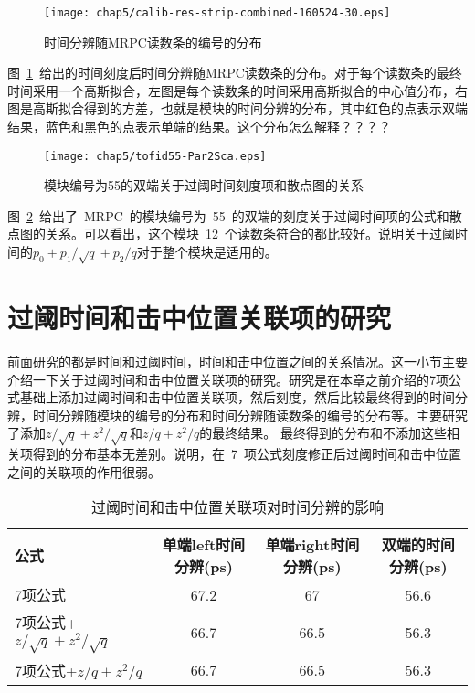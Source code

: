 \begin{figure}[!h]
\centering
\texttt{[image: chap5/calib-res-strip-combined-160524-30.eps]}
\caption{时间分辨随MRPC读数条的编号的分布}
\label{fig:calib-res-strip-combined-160524-30}
\end{figure}
图~\ref{fig:calib-res-strip-combined-160524-30}~给出的时间刻度后时间分辨随MRPC读数条的分布。对于每个读数条的最终时间采用一个高斯拟合，左图是每个读数条的时间采用高斯拟合的中心值分布，右图是高斯拟合得到的方差，也就是模块的时间分辨的分布，其中红色的点表示双端结果，蓝色和黑色的点表示单端的结果。这个分布怎么解释？？？？

\begin{figure}[!h]
\centering
\texttt{[image: chap5/tofid55-Par2Sca.eps]}
\caption{模块编号为55的双端关于过阈时间刻度项和散点图的关系}
\label{fig:tofid55-Par2Sca}
\end{figure}
图~\ref{fig:tofid55-Par2Sca}~给出了~MRPC~的模块编号为~55~的双端的刻度关于过阈时间项的公式和散点图的关系。可以看出，这个模块~12~个读数条符合的都比较好。说明关于过阈时间的$p_{0}+p_{1}/\sqrt{q}+p_{2}/q$对于整个模块是适用的。

\section{过阈时间和击中位置关联项的研究}
前面研究的都是时间和过阈时间，时间和击中位置之间的关系情况。这一小节主要介绍一下关于过阈时间和击中位置关联项的研究。研究是在本章之前介绍的7项公式基础上添加过阈时间和击中位置关联项，然后刻度，然后比较最终得到的时间分辨，时间分辨随模块的编号的分布和时间分辨随读数条的编号的分布等。主要研究了添加$z/\sqrt{q}+z^{2}/\sqrt{q}$和$z/q+z^{2}/q$的最终结果。
最终得到的分布和不添加这些相关项得到的分布基本无差别。说明，在~7~项公式刻度修正后过阈时间和击中位置之间的关联项的作用很弱。

\begin{table}[h]
    \centering
    \caption{\label{tbl:some-res} 过阈时间和击中位置关联项对时间分辨的影响}
  \footnotesize
    \begin{tabular}{lccc}
        \hline
        公式& 单端left时间分辨(ps)& 单端right时间分辨(ps)& 双端的时间分辨(ps)\\
        \hline
        7项公式& 67.2& 67& 56.6 \\
        7项公式+$z/\sqrt{q}+z^{2}/\sqrt{q}$& 66.7& 66.5& 56.3 \\
        7项公式+$z/q+z^{2}/q$& 66.7& 66.5& 56.3 \\
        \hline
    \end{tabular}
\end{table}

